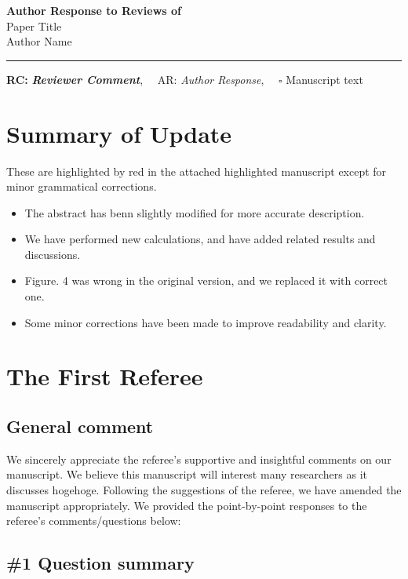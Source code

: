 \documentclass[luatex,onecolumn,showpacs,aps,preprint,prb,amsfonts,amsmath,amssymb,floatfix,groupedaddress, longbibliography]{revtex4-2}
\def\papertitle{Paper Title}
\def\authors{Author Name}
\def\journal{}
\def\doi{}
\providecommand{\lettertitle}{Author Response to Reviews of}
\providecommand{\papertitle}{Title}
\providecommand{\authors}{Authors}
\providecommand{\journal}{Journal}
\begin{document}
{\Large\bf \lettertitle}\\[1em]
{\huge \papertitle}\\[1em]
{\authors}\\
\hrule

\hfill {\bfseries RC:} \textbf{\textit{Reviewer Comment}},\(\quad\) AR: \emph{Author Response}, \(\quad\square\) Manuscript text

\section{Summary of Update}

\lipsum[10]

These are highlighted by red in the attached highlighted manuscript except for minor grammatical corrections.

\begin{itemize}
  \item The abstract has benn slightly modified for more accurate description.
  \item We have performed new calculations, and have added related results and discussions. 
  \item Figure. 4 was wrong in the original version, and we replaced it with correct one.
  \item Some minor corrections have been made to improve readability and clarity.
\end{itemize}


\section{The First Referee}

\subsection{General comment}

\RC \lipsum[1]

\AR We sincerely appreciate the referee’s supportive and insightful comments on our manuscript. We believe this manuscript will interest many researchers as it discusses hogehoge. Following the suggestions of the referee, we have amended the manuscript appropriately. We provided the point-by-point responses to the referee’s comments/questions below:

\subsection{\#1 Question summary}
\end{document}
